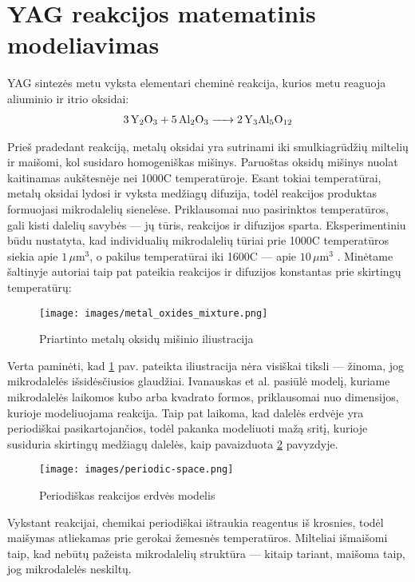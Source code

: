 \section{YAG reakcijos matematinis modeliavimas}

YAG sintezės metu vyksta elementari cheminė reakcija, kurios metu reaguoja aliuminio ir itrio oksidai:
\begin{align*}
  \ce{3Y_2O_3 + 5Al_2O_3 -> 2Y_3Al_5O_12}
\end{align*}

Prieš pradedant reakciją, metalų oksidai yra sutrinami iki smulkiagrūdžių miltelių ir maišomi, kol susidaro homogeniškas mišinys. Paruoštas oksidų mišinys nuolat kaitinamas aukštesnėje nei 1000\degree C temperatūroje. Esant tokiai temperatūrai, metalų oksidai lydosi ir vyksta medžiagų difuzija, todėl reakcijos produktas formuojasi mikrodalelių sienelėse. Priklausomai nuo pasirinktos temperatūros, gali kisti dalelių savybės — jų tūris, reakcijos ir difuzijos sparta. Eksperimentiniu būdu nustatyta, kad individualių mikrodalelių tūriai prie 1000\degree C temperatūros siekia apie $1\,\mu\text{m}^3$, o pakilus temperatūrai iki 1600\degree C — apie $10\,\mu\text{m}^3$ \cite{ivanauskasComputationalModellingYAG2009}. Minėtame šaltinyje autoriai taip pat pateikia reakcijos ir difuzijos konstantas prie skirtingų temperatūrų:

\begin{figure}[h]
  \centering
  \texttt{[image: images/metal\_oxides\_mixture.png]}
  \caption{Priartinto metalų oksidų mišinio iliustracija \cite{ivanauskasComputationalModellingYAG2009}}
  \label{fig:metal-oxides-mixuter}
\end{figure}

Verta paminėti, kad \ref{fig:metal-oxides-mixuter} pav. pateikta iliustracija nėra visiškai tiksli — žinoma, jog mikrodalelės išsidėsčiusios glaudžiai. Ivanauskas et al. \cite{ivanauskasModellingSolidState2005} pasiūlė modelį, kuriame mikrodalelės laikomos kubo arba kvadrato formos, priklausomai nuo dimensijos, kurioje modeliuojama reakcija. Taip pat laikoma, kad dalelės erdvėje yra periodiškai pasikartojančios, todėl pakanka modeliuoti mažą sritį, kurioje susiduria skirtingų medžiagų dalelės, kaip pavaizduota \ref{fig:periodic-space} pavyzdyje.

\begin{figure}[h]
  \centering
  \texttt{[image: images/periodic-space.png]}
  \caption{Periodiškas reakcijos erdvės modelis}
  \label{fig:periodic-space}
\end{figure}

Vykstant reakcijai, chemikai periodiškai ištraukia reagentus iš krosnies, todėl maišymas atliekamas prie gerokai žemesnės temperatūros. Milteliai išmaišomi taip, kad nebūtų pažeista mikrodalelių struktūra — kitaip tariant, maišoma taip, jog mikrodalelės neskiltų.